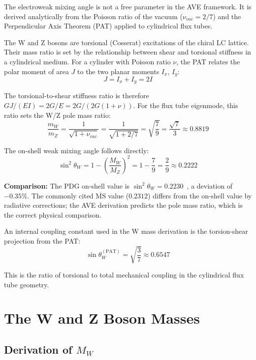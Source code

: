The electroweak mixing angle is not a free parameter in the AVE framework. It is derived analytically from the Poisson ratio of the vacuum ($\nu_{vac} = 2/7$) and the Perpendicular Axis Theorem (PAT) applied to cylindrical flux tubes.

The W and Z bosons are torsional (Cosserat) excitations of the chiral LC lattice. Their mass ratio is set by the relationship between shear and torsional stiffness in a cylindrical medium. For a cylinder with Poisson ratio $\nu$, the PAT relates the polar moment of area $J$ to the two planar moments $I_x$, $I_y$:
\begin{equation}
    J = I_x + I_y = 2I
\end{equation}

The torsional-to-shear stiffness ratio is therefore $GJ/(EI) = 2G/E = 2G/(2G(1+\nu))$. For the flux tube eigenmode, this ratio sets the W/Z pole mass ratio:
\begin{equation}
    \frac{m_W}{m_Z} = \frac{1}{\sqrt{1 + \nu_{vac}}} = \frac{1}{\sqrt{1 + 2/7}} = \sqrt{\frac{7}{9}} = \frac{\sqrt{7}}{3} \approx 0.8819
\end{equation}

The on-shell weak mixing angle follows directly:
\begin{equation}
    \sin^2\theta_W = 1 - \left(\frac{M_W}{M_Z}\right)^2 = 1 - \frac{7}{9} = \frac{2}{9} \approx 0.2222
\end{equation}

\noindent\textbf{Comparison:} The PDG on-shell value is $\sin^2\theta_W = 0.2230$~\cite{pdg2022}, a deviation of $-0.35\%$. The commonly cited $\overline{\text{MS}}$ value ($0.2312$) differs from the on-shell value by radiative corrections; the AVE derivation predicts the pole mass ratio, which is the correct physical comparison.

An internal coupling constant used in the W mass derivation is the torsion-shear projection from the PAT:
\begin{equation}
    \sin\theta_W^{(\text{PAT})} = \sqrt{\frac{3}{7}} \approx 0.6547
\end{equation}

This is the ratio of torsional to total mechanical coupling in the cylindrical flux tube geometry.

\section{The W and Z Boson Masses}

\subsection{Derivation of $M_W$}

